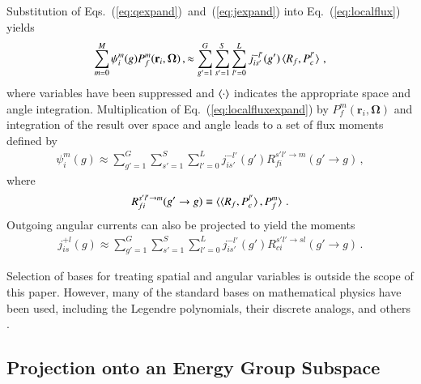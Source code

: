\documentclass[5p,times,twocolumn,10pt]{elsarticle}
\newcommand{\EQ}[1]{Eq.~(\ref{#1})}               %
\newcommand{\EQSTWO}[2]{Eqs.~(\ref{#1})~and~(\ref{#2})}            %
\begin{document}
  Substitution of \EQSTWO{eq:qexpand}{eq:jexpand}
  into \EQ{eq:localflux}  yields
  \begin{equation}
    \begin{split}
      \sum^M_{m=0} \psi_{i}^m(g) P^m_f(\mathbf{r}_i,\bm{\Omega}) \, , \approx  
      \sum^{G}_{g'=1}  \sum^{S}_{s'=1} \sum_{l'=0}^L  j^{-l'}_{is'}(g') 
      \braket{ R_{f}, P^{l'}_c }    \, ,             
    \end{split}           
    \label{eq:localfluxexpand}
  \end{equation}
  where variables have been suppressed and 
  $\braket{\cdot}$ indicates the appropriate space and 
  angle integration.  
  Multiplication of \EQ{eq:localfluxexpand} by 
  $P^{m}_{f}(\mathbf{r}_i, \bm{\Omega})$
  and integration of the result over space and angle leads to 
  a set of flux moments defined by
  \begin{equation}
    \begin{split}
      \psi^{m}_{i}(g) \approx 
      \sum^{G}_{g'=1} \sum^{S}_{s'=1} \sum_{l'=0}^L  
      j^{-l'}_{is'}(g') R^{s'l' \to m}_{fi}(g'\rightarrow g)  \, ,
    \end{split}           
    \label{eq:fluxmoments}
  \end{equation}
  where
  \begin{equation}
    R^{s'l' \to m}_{fi}(g'\rightarrow g) \equiv  
    \braket{ \braket{ R_{f}, P^{l'}_c}, P^{m}_f} \, .
  \end{equation}
  Outgoing angular currents 
  can also be projected to yield the moments
  \begin{equation}
    \begin{split}
      j^{+l}_{is}(g) \approx 
      \sum^{G}_{g'=1} \sum^{S}_{s'=1} \sum_{l'=0}^L  
      j^{-l'}_{is'}(g') R^{s'l' \to sl}_{ci}(g'\rightarrow g)  \, .        
    \end{split}              
    \label{eq:jmoments}
  \end{equation}
  
  Selection of bases for treating spatial and angular variables
  is outside the scope of this paper.  However, many of the standard 
  bases on mathematical physics have been used, including the
  Legendre polynomials, their discrete analogs, and 
  others \cite{RobertsSerment}.
  
  \subsection{Projection onto an Energy Group Subspace}
  
\end{document}
